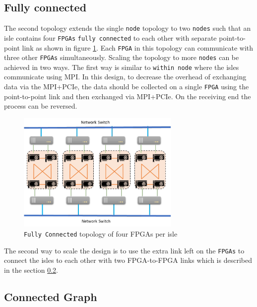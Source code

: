\subsection{Fully connected}
\label{sec:fully_connect}

The second topology extends the single \texttt{node} topology to two \texttt{nodes} such that
an isle contains four \texttt{FPGAs} \texttt{fully connected} to each other with separate
point-to-point link as shown in figure \ref{fig:fully_connect}.
Each \texttt{FPGA} in this topology can communicate with three
other \texttt{FPGAs} simultaneously. Scaling the topology to more \texttt{nodes} can be achieved
in two ways. The first way is similar to \texttt{within node} where the isles communicate
using MPI. In this design, to decrease the overhead of exchanging data via the
MPI+PCIe, the data should be collected on a single \texttt{FPGA} using the point-to-point
link and then exchanged via MPI+PCIe. On the receiving end the process can be
reversed.


\begin{figure}[h]%
    \centering
    \includegraphics[width=0.7\textwidth]{images/full_connect}
    \caption{\texttt{Fully Connected} topology of four FPGAs per isle}
    \label{fig:fully_connect}
\end{figure}

The second way to scale the design is to use the extra link left on the
\texttt{FPGAs} to connect the isles to each other with two FPGA-to-FPGA links which is
described in the section \ref{sec:connected_graph}.

\subsection{Connected Graph}
\label{sec:connected_graph}

